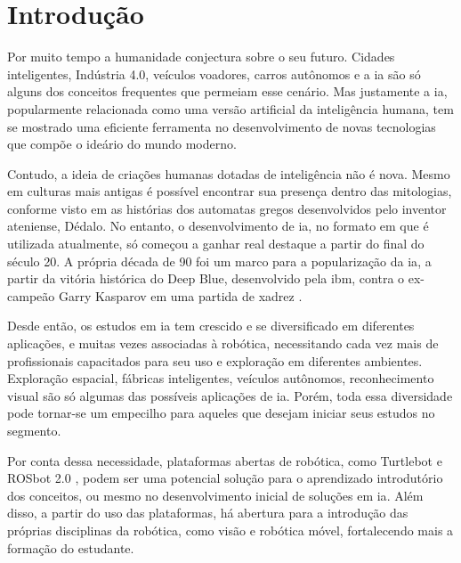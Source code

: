 \chapter{Introdução}
\label{chap:intro}

Por muito tempo a humanidade conjectura sobre o seu futuro. Cidades inteligentes, Indústria 4.0, veículos voadores, carros autônomos e a \gls*{ia} são só alguns dos conceitos frequentes que permeiam esse cenário. Mas justamente a \gls*{ia}, popularmente relacionada como uma versão artificial da inteligência humana, tem se mostrado uma eficiente ferramenta no desenvolvimento de novas tecnologias que compõe o ideário do mundo moderno.

Contudo, a ideia de criações humanas dotadas de inteligência não é nova. Mesmo em culturas mais antigas é possível encontrar sua presença dentro das mitologias, conforme visto em  as histórias dos automatas gregos desenvolvidos pelo inventor ateniense, Dédalo. No entanto, o desenvolvimento de \gls*{ia}, no formato em que é utilizada atualmente, só começou a ganhar real destaque a partir do final do século 20. A própria década de 90 foi um marco para a popularização da \gls*{ia}, a partir da vitória histórica do Deep Blue, desenvolvido pela \gls*{ibm}, contra o ex-campeão Garry Kasparov em uma partida de xadrez \cite{McCorduck2004}. 

Desde então, os estudos em \gls*{ia} tem crescido e se diversificado em diferentes aplicações, e muitas vezes associadas à robótica, necessitando cada vez mais de profissionais capacitados para seu uso e exploração em diferentes ambientes. Exploração espacial, fábricas inteligentes, veículos autônomos, reconhecimento visual são só algumas das possíveis aplicações de \gls*{ia}. Porém, toda essa diversidade pode tornar-se um empecilho para aqueles que desejam iniciar seus estudos no segmento.

Por conta dessa necessidade, plataformas abertas de robótica, como Turtlebot \cite{Turtlebot} e ROSbot 2.0 \cite{ROSbot}, podem ser uma potencial solução para o aprendizado introdutório dos conceitos, ou mesmo no desenvolvimento inicial de soluções em \gls*{ia}. Além disso, a partir do uso das plataformas, há abertura para a introdução das próprias disciplinas da robótica, como visão e robótica móvel, fortalecendo mais a formação do estudante.

